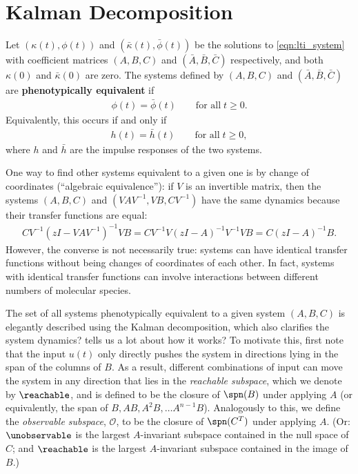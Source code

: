 
\section{Kalman Decomposition} \label{apx:kalman}
\begin{definition}
    Let $(\kappa(t),\phi(t))$ and $(\bar \kappa(t),\bar \phi(t))$ be the solutions to \eqref{eqn:lti_system}
    with coefficient matrices $(A,B,C)$ and $(\bar A,\bar B,\bar C)$ respectively,
    and both $\kappa(0)$ and $\bar \kappa(0)$ are zero. 
    The systems defined by $(A,B,C)$ and $(\bar A,\bar B,\bar C)$ are
    \textbf{phenotypically equivalent} 
    if
    \begin{align*}
        \phi(t) = \bar \phi(t) \qquad \text{for all} \; t \ge 0.
    \end{align*}
    Equivalently, this occurs if and only if
    \begin{align*}
        h(t) = \bar h(t)  \qquad \text{for all} \; t \ge 0,
    \end{align*}
    where $h$ and $\bar h$ are the impulse responses of the two systems.
\end{definition}

One way to find other systems equivalent to a given one
is by change of coordinates (``algebraic equivalence''):
if $V$ is an invertible matrix, then the systems $(A,B,C)$ and $(VAV^{-1},VB,CV^{-1})$
have the same dynamics because their transfer functions are equal:
\begin{align*}
    CV^{-1}( zI - VAV^{-1})^{-1}VB
    =
    CV^{-1}V( zI - A)^{-1}V^{-1}VB
    =
    C( zI - A)^{-1}B .
\end{align*}
However, the converse is not necessarily true: 
systems can have identical transfer functions without being changes of coordinates of each other.
In fact, systems with identical transfer functions can involve interactions between different
numbers of molecular species.

The set of all systems phenotypically equivalent to a given system $(A,B,C)$ 
is elegantly described using the Kalman decomposition,
which also clarifies the system dynamics? tells us a lot about how it works? 
To motivate this, first note that the input $u(t)$ only directly pushes the system
in directions lying in the span of the columns of $B$.
As a result, different combinations of input can 
move the system in any direction that lies in the \emph{reachable subspace},
which we denote by $\reachable$,
and is defined to be the closure of $\spn(B)$ under applying $A$
(or equivalently, the span of $B, AB, A^2B, \ldots A^{n-1}B$).
Analogously to this, we define
the \emph{observable subspace}, $\mathcal{O}$,
to be the closure of $\spn(C^T)$ under applying $A$.
(Or: $\unobservable$ is the largest $A$-invariant subspace
contained in the null space of $C$;
and $\reachable$ is the largest $A$-invariant subspace contained in the image of $B$.)

